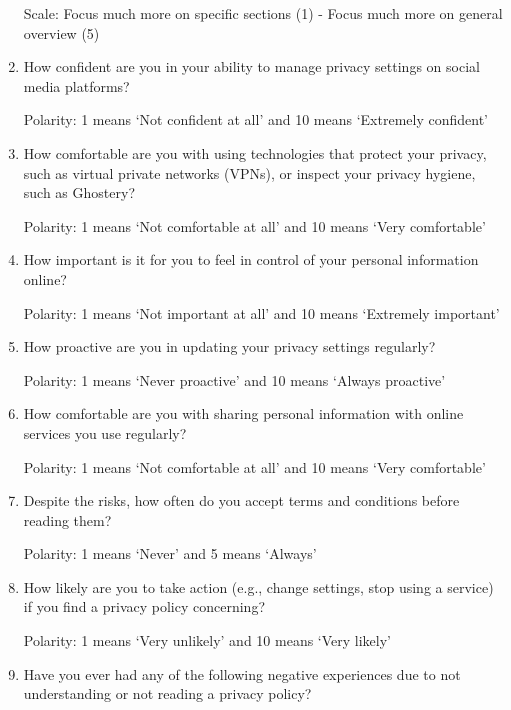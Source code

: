 \begin{enumerate}
    Scale: Focus much more on specific sections (1) - Focus much more on general overview (5)

    \item How confident are you in your ability to manage privacy settings on social media platforms?

    Polarity: 1 means `Not confident at all’ and 10 means ‘Extremely confident’
        
    \item How comfortable are you with using technologies that protect your privacy, such as virtual private networks (VPNs), or inspect your privacy hygiene, such as Ghostery?


    Polarity: 1 means ‘Not comfortable at all’ and 10 means ‘Very comfortable’

    \item How important is it for you to feel in control of your personal information online?

    Polarity: 1 means ‘Not important at all’ and 10 means ‘Extremely important’

    \item How proactive are you in updating your privacy settings regularly?

    Polarity: 1 means ‘Never proactive’ and 10 means ‘Always proactive’

    \item How comfortable are you with sharing personal information with online services you use regularly?

    Polarity: 1 means ‘Not comfortable at all’ and 10 means ‘Very comfortable’

    \item Despite the risks, how often do you accept terms and conditions before reading them?

    Polarity: 1 means ‘Never’ and 5 means ‘Always’

    \item How likely are you to take action (e.g., change settings, stop using a service) if you find a privacy policy concerning?
    
    Polarity: 1 means ‘Very unlikely’ and 10 means ‘Very likely’


    \item Have you ever had any of the following negative experiences due to not understanding or not reading a privacy policy?
    

\end{enumerate}
